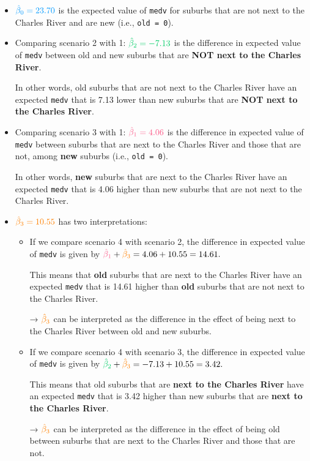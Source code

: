 \documentclass[
  12pt,
  a4paper,
]{scrbook}
\theoremstyle{plain}
\theoremstyle{definition}
\theoremstyle{remark}
\begin{document}
\begin{itemize}
\item
  \(\color[HTML]{0099FF}{\hat{\beta}_0} = 23.70\) is the expected value
  of \texttt{medv} for suburbs that are not next to the Charles River
  and are new (i.e., \texttt{old\ =\ 0}).
\item
  Comparing scenario 2 with 1:
  \(\color[HTML]{00CC66}{\hat{\beta}_2} = -7.13\) is the difference in
  expected value of \texttt{medv} between old and new suburbs that are
  \textbf{NOT next to the Charles River}.

  In other words, old suburbs that are not next to the Charles River
  have an expected \texttt{medv} that is 7.13 lower than new suburbs
  that are \textbf{NOT next to the Charles River}.
\item
  Comparing scenario 3 with 1:
  \(\color[HTML]{fb5b89}{\hat{\beta}_1} = 4.06\) is the difference in
  expected value of \texttt{medv} between suburbs that are next to the
  Charles River and those that are not, among \textbf{new} suburbs
  (i.e., \texttt{old\ =\ 0}).

  In other words, \textbf{new} suburbs that are next to the Charles
  River have an expected \texttt{medv} that is 4.06 higher than new
  suburbs that are not next to the Charles River.
\item
  \(\color{orange}{\hat{\beta}_3} = 10.55\) has two interpretations:

  \begin{itemize}
  \item
    If we compare scenario 4 with scenario 2, the difference in expected
    value of \texttt{medv} is given by
    \({\color[HTML]{fb5b89}\hat{\beta}_1} + {\color{orange}\hat{\beta}_3} = 4.06 + 10.55 = 14.61.\)

    This means that \textbf{old} suburbs that are next to the Charles
    River have an expected \texttt{medv} that is 14.61 higher than
    \textbf{old} suburbs that are not next to the Charles River.

    → \(\color{orange}{\hat{\beta}_3}\) can be interpreted as the
    difference in the effect of being next to the Charles River between
    old and new suburbs.
  \item
    If we compare scenario 4 with scenario 3, the difference in expected
    value of \texttt{medv} is given by
    \({\color[HTML]{00CC66}\hat{\beta}_2} + {\color{orange}\hat{\beta}_3} = -7.13 + 10.55 = 3.42.\)

    This means that old suburbs that are \textbf{next to the Charles
    River} have an expected \texttt{medv} that is 3.42 higher than new
    suburbs that are \textbf{next to the Charles River}.

    → \(\color{orange}{\hat{\beta}_3}\) can be interpreted as the
    difference in the effect of being old between suburbs that are next
    to the Charles River and those that are not.
  \end{itemize}
\end{itemize}
\end{document}
